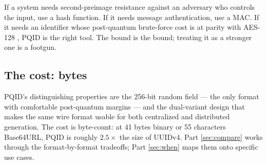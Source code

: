 If a system needs second-preimage resistance against an adversary who controls the input, use a hash function. If it needs message authentication, use a MAC. If it needs an identifier whose post-quantum brute-force cost is at parity with AES-128 \citep{fips197}, PQID is the right tool. The bound is the bound; treating it as a stronger one is a footgun.

\subsection{The cost: bytes}

PQID's distinguishing properties are the 256-bit random field --- the only format with comfortable post-quantum margins --- and the dual-variant design that makes the same wire format usable for both centralized and distributed generation. The cost is byte-count: at 41 bytes binary or 55 characters Base64URL, PQID is roughly $2.5\times$ the size of UUIDv4. Part \ref{sec:compare} works through the format-by-format tradeoffs; Part \ref{sec:when} maps them onto specific use cases.

